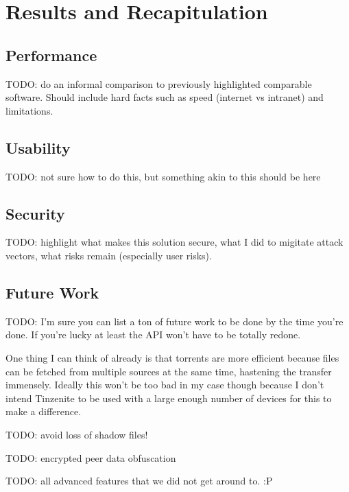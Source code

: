 \chapter{Results and Recapitulation}
\label{chap:results}


\section{Performance}

TODO: do an informal comparison to previously highlighted comparable software.
Should include hard facts such as speed (internet vs intranet) and limitations.

\section{Usability}

TODO: not sure how to do this, but something akin to this should be here

\section{Security}

TODO: highlight what makes this solution secure, what I did to migitate attack vectors, what risks remain (especially user risks).

\section{Future Work}

TODO: I'm sure you can list a ton of future work to be done by the time you're done.
If you're lucky at least the API won't have to be totally redone.

One thing I can think of already is that torrents are more efficient because files can be fetched from multiple sources at the same time, hastening the transfer immensely.
Ideally this won't be too bad in my case though because I don't intend Tinzenite to be used with a large enough number of devices for this to make a difference.

TODO: avoid loss of shadow files!

TODO: encrypted peer data obfuscation

TODO: all advanced features that we did not get around to. :P
